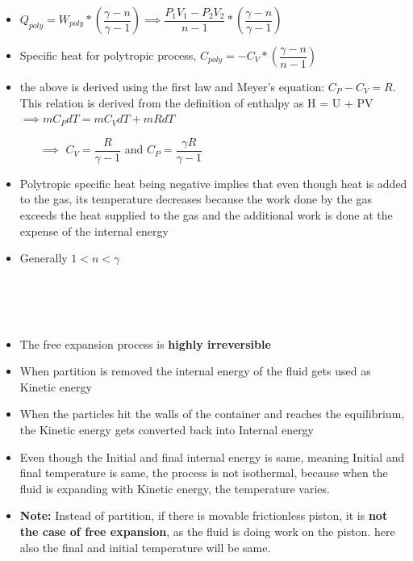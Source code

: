 \documentclass[8pt]{article}
\begin{document}
	\begin{itemize}
		\item $Q_{poly} = W_{poly}*\left(\dfrac{\gamma -n}{\gamma -1}\right) \implies \boxed{\dfrac{P_1V_1-P_2V_2}{n-1}*\left(\dfrac{\gamma -n}{\gamma -1}\right)}$
		\item Specific heat for polytropic process, $\boxed{C_{poly} = -C_V*\left(\dfrac{\gamma -n}{n-1}\right)}$
		\item the above is derived using the first law and Meyer's equation: $C_P-C_V=R$. This relation is derived from the definition of enthalpy as H = U + PV $\implies mC_PdT = mC_VdT + mRdT$
			\begin{itemize}
				\item[$\implies$] $C_V = \dfrac{R}{\gamma -1}$ and $C_P = \dfrac{\gamma R}{\gamma -1}$
			\end{itemize}
		\item Polytropic specific heat being negative implies that even though heat is added to the gas, its temperature decreases because the work done by the gas exceeds the heat supplied to the gas and the additional work is done at the expense of the internal energy
		\item Generally $1 < n < \gamma$
	\end{itemize}\hrulefill\\\\
\\
	\begin{itemize}[wide]
		\item The free expansion process is \textbf{highly irreversible} 
		\item When partition is removed the internal energy of the fluid gets used as Kinetic energy
		\item When the particles hit the walls of the container and reaches the equilibrium, the Kinetic energy gets converted back into Internal energy
		\item Even though the Initial and final internal energy is same, meaning Initial and final temperature is same, the process is not isothermal, because when the fluid is expanding with Kinetic energy, the temperature varies.
		\item \textbf{Note:} Instead of partition, if there is movable frictionless piston, it is \textbf{not the case of free expansion}, as the fluid is doing work on the piston. here also the final and initial temperature will be same.
	\end{itemize}
\end{document}
